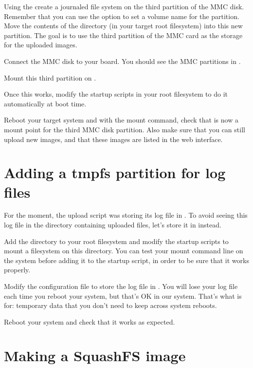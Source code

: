 Using the  create a journaled file system on the
third partition of the MMC disk. Remember that you can use the
 option to set a volume name for the partition. Move the
contents of the  directory (in your target root
filesystem) into this new partition. The goal is to use the third
partition of the MMC card as the storage for the uploaded images.

Connect the MMC disk to your board. You should see the MMC partitions
in .

Mount this third partition on .

Once this works, modify the startup scripts in your root filesystem
to do it automatically at boot time.

Reboot your target system and with the mount command, check that
 is now a mount point for the third MMC disk
partition. Also make sure that you can still upload new images, and
that these images are listed in the web interface.

\section{Adding a tmpfs partition for log files}

For the moment, the upload script was storing its log file in
. To avoid seeing this log file in
the directory containing uploaded files, let's store it in
 instead.

Add the  directory to your root filesystem and modify
the startup scripts to mount a  filesystem on this
directory. You can test your  mount command line on the
system before adding it to the startup script, in order to be sure
that it works properly.

Modify the  configuration file to store
the log file in . You will lose your log
file each time you reboot your system, but that's OK in our
system. That's what  is for: temporary data that you don't need
to keep across system reboots.

Reboot your system and check that it works as expected.

\section{Making a SquashFS image}

